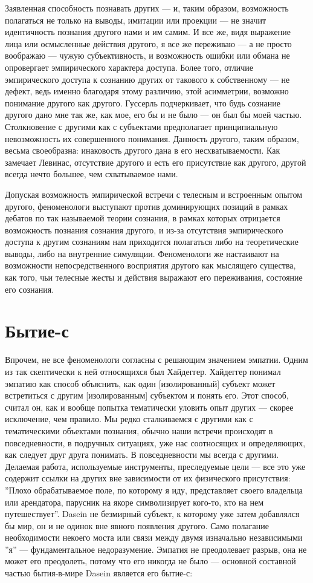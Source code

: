 \documentclass[11pt]{book}
\begin{document}
Заявленная способность познавать других --- и, таким образом, возможность полагаться не только на выводы, имитации или проекции --- не значит идентичность познания другого нами и им самим. И все же, видя выражение лица или осмысленные действия другого, я все же переживаю --- а не просто воображаю --- чужую субъективность, и возможность ошибки или обмана не опровергает эмпирического характера доступа. Более того, отличие эмпирического доступа к сознанию других от такового к собственному --- не дефект, ведь именно благодаря этому различию, этой асимметрии, возможно понимание другого как другого. Гуссерль подчеркивает, что будь сознание другого дано мне так же, как мое, его бы и не было --- он был бы моей частью. Столкновение с другими как с субъектами предполагает принципиальную невозможность их совершенного понимания. Данность другого, таким образом, весьма своеобразна: инаковость другого дана в его несхватываемости. Как замечает Левинас, отсутствие другого и есть его присутствие как другого, другой всегда нечто большее, чем схватываемое нами.

Допуская возможность эмпирической встречи с телесным и встроенным опытом другого, феноменологи выступают против доминирующих позиций в рамках дебатов по так называемой теории сознания, в рамках которых отрицается возможность познания сознания другого, и из-за отсутствия эмпирического доступа к другим сознаниям нам приходится полагаться либо на теоретические выводы, либо на внутренние симуляции. Феноменологи же настаивают на возможности непосредственного восприятия другого как мыслящего существа, как того, чьи телесные жесты и действия выражают его переживания, состояние его сознания.

\section{Бытие-с}

Впрочем, не все феноменологи согласны с решающим значением эмпатии. Одним из так скептически к ней относящихся был Хайдеггер. Хайдеггер понимал эмпатию как способ объяснить, как один [изолированный] субъект может встретиться с другим [изолированным] субъектом и понять его. Этот способ, считал он, как и вообще попытка тематически уловить опыт других --- скорее исключение, чем правило. Мы редко сталкиваемся с другими как с тематическими объектами познания, обычно наши встречи происходят в повседневности, в подручных ситуациях, уже нас соотносящих и определяющих, как следует друг друга понимать. В повседневности мы всегда с другими. Делаемая работа, используемые инструменты, преследуемые цели --- все это уже содержит ссылки на других вне зависимости от их физического присутствия: ''Плохо обрабатываемое поле, по которому я иду, представляет своего владельца или арендатора, парусник на якоре символизирует кого-то, кто на нем путешествует''. Dasein не безмирный субъект, к которому уже затем добавлялся бы мир, он и не одинок вне явного появления другого. Само полагание необходимости некоего моста или связи между двумя изначально независимыми ''я'' --- фундаментальное недоразумение. Эмпатия не преодолевает разрыв, она не может его преодолеть, потому что его никогда не было --- основной составной частью бытия-в-мире Dasein является его бытие-с:
\end{document}

